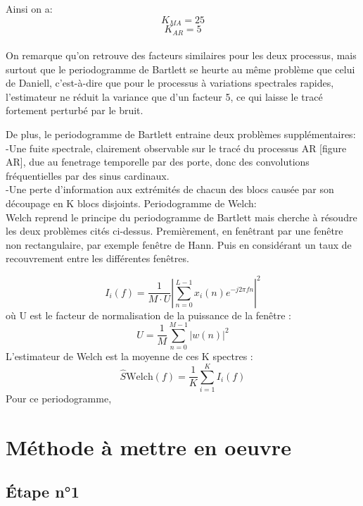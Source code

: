 \documentclass[11pt,a4paper]{article}
\begin{document}
Ainsi on a: 
$$K_{MA} = 25$$  $$K_{AR} = 5$$
\\
\indent On remarque qu'on retrouve des facteurs similaires pour les deux processus, mais surtout que le periodogramme de Bartlett se heurte au même problème que celui de Daniell, c'est-à-dire que pour le processus à variations spectrales rapides, l'estimateur ne réduit la variance que d'un facteur 5, ce qui laisse le tracé fortement perturbé par le bruit.

De plus, le periodogramme de Bartlett entraine deux problèmes supplémentaires: 
\\-Une fuite spectrale, clairement observable sur le tracé du processus AR [figure AR], due au fenetrage temporelle par des porte, donc des convolutions fréquentielles par des sinus cardinaux.
\\-Une perte d'information aux extrémités de chacun des blocs causée par son découpage en K blocs disjoints. 
\newline
Periodogramme de Welch:\\
\indent Welch reprend le principe du periodogramme de Bartlett mais cherche à résoudre les deux problèmes cités ci-dessus. Premièrement, en fenêtrant par une fenêtre non rectangulaire, par exemple fenêtre de Hann. Puis en considérant un taux de recouvrement entre les différentes fenêtres.

\begin{equation}
  I_i(f) = \frac{1}{M \cdot U} \left| \sum_{n=0}^{L-1} x_i(n) e^{-j 2 \pi f n} \right|^2
  \end{equation}
  où U est le facteur de normalisation de la puissance de la fenêtre :
  \begin{equation}
  U = \frac{1}{M} \sum_{n=0}^{M-1} |w(n)|^2
  \end{equation}
  L'estimateur de Welch est la moyenne de ces K spectres :
  \begin{equation}
  \hat{S}{\text{Welch}}(f) = \frac{1}{K} \sum_{i=1}^{K} I_i(f)
\end{equation}
Pour ce periodogramme, 




\section{Méthode à mettre en oeuvre}

\subsection{Étape n°1}
\end{document}
